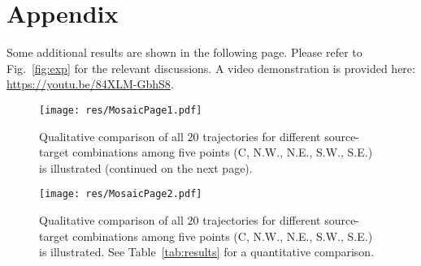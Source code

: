 

\section*{Appendix}
Some additional results are shown in the following page. Please refer to Fig.~\ref{fig:exp} for the relevant discussions. A video demonstration is provided here: \url{https://youtu.be/84XLM-GbhS8}.

\begin{figure*}
    \centering
    \texttt{[image: res/MosaicPage1.pdf]}
    \caption{
        Qualitative comparison of all $20$ trajectories for different source-target combinations among five points (C, N.W., N.E., S.W., S.E.) is illustrated (continued on the next page).
    }
\end{figure*}

\begin{figure*}
    \centering
    \texttt{[image: res/MosaicPage2.pdf]}
    \caption{
       Qualitative comparison of all $20$ trajectories for different source-target combinations among five points (C, N.W., N.E., S.W., S.E.) is illustrated. See Table~\ref{tab:results} for a quantitative comparison. 
    }
\end{figure*}
